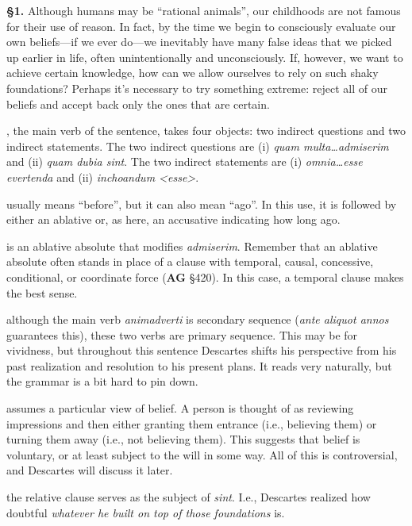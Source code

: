 \prenotes

\textbf{§1.} Although humans may be ``rational animals'', our childhoods are not famous for their use of reason. In fact, by the time we begin to consciously evaluate our own beliefs---if we ever do---we inevitably have many false ideas that we picked up earlier in life, often unintentionally and unconsciously. If, however, we want to achieve certain knowledge, how can we allow ourselves to rely on such shaky foundations? Perhaps it's necessary to try something extreme: reject all of our beliefs and accept back only the ones that are certain.

, the main verb of the sentence, takes four objects: two indirect questions and two indirect statements. The two indirect questions are (i) \textit{quam multa\dots admiserim} and (ii) \textit{quam dubia sint}. The two indirect statements are (i) \textit{omnia\dots esse evertenda} and (ii) \textit{inchoandum <esse>}.

 usually means ``before'', but it can also mean ``ago''. In this use, it is followed by either an ablative or, as here, an accusative indicating how long ago.

 is an ablative absolute that modifies \textit{admiserim}. Remember that an ablative absolute often stands in place of a clause with temporal, causal, concessive, conditional, or coordinate force (\textbf{AG} §420). In this case, a temporal clause makes the best sense.

 although the main verb \textit{animadverti} is secondary sequence (\textit{ante aliquot annos} guarantees this), these two verbs are primary sequence. This may be for vividness, but throughout this sentence Descartes shifts his perspective from his past realization and resolution to his present plans. It reads very naturally, but the grammar is a bit hard to pin down.

 assumes a particular view of belief. A person is thought of as reviewing impressions and then either granting them entrance (i.e., believing them) or turning them away (i.e., not believing them). This suggests that belief is voluntary, or at least subject to the will in some way. All of this is controversial, and Descartes will discuss it later.

 the relative clause serves as the subject of \textit{sint}. I.e., Descartes realized how doubtful \textit{whatever he built on top of those foundations} is.

